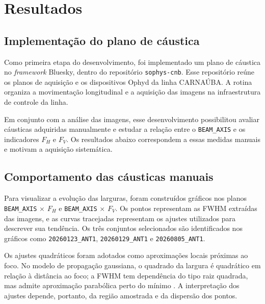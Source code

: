 \documentclass[12pt,a4paper]{article}
\makeatletter
\newcommand{\rotulosecao}[2]{%
    \phantomsection
    \def\@currentlabelname{#2}%
    \label{#1}%
}
\makeatother
\begin{document}
\clearpage
{}
\section*{Resultados}
\rotulosecao{sec:resultados}{Resultados}

\subsection*{Implementação do plano de cáustica}
\rotulosecao{sec:resultados-plano-caustica}{Implementação do plano de cáustica}

Como primeira etapa do desenvolvimento, foi implementado um plano de cáustica no \textit{framework} Bluesky, dentro do repositório \texttt{sophys-cnb}. Esse repositório reúne os planos de aquisição e os dispositivos Ophyd da linha CARNAÚBA. A rotina organiza a movimentação longitudinal e a aquisição das imagens na infraestrutura de controle da linha.

Em conjunto com a análise das imagens, esse desenvolvimento possibilitou avaliar cáusticas adquiridas manualmente e estudar a relação entre o \texttt{BEAM\_AXIS} e os indicadores $F_H$ e $F_V$. Os resultados abaixo correspondem a essas medidas manuais e motivam a aquisição sistemática.

\subsection*{Comportamento das cáusticas manuais}
\rotulosecao{sec:resultados-causticas-manuais}{Comportamento das cáusticas manuais}

Para visualizar a evolução das larguras, foram construídos gráficos nos planos \texttt{BEAM\_AXIS} $\times$ $F_H$ e \texttt{BEAM\_AXIS} $\times$ $F_V$. Os pontos representam as FWHM extraídas das imagens, e as curvas tracejadas representam os ajustes utilizados para descrever sua tendência. Os três conjuntos selecionados são identificados nos gráficos como \texttt{20260123\_ANT1}, \texttt{20260129\_ANT1} e \texttt{20260805\_ANT1}.

Os ajustes quadráticos foram adotados como aproximações locais próximas ao foco. No modelo de propagação gaussiana, o quadrado da largura é quadrático em relação à distância ao foco; a FWHM tem dependência do tipo raiz quadrada, mas admite aproximação parabólica perto do mínimo \cite{osterhoff2019foco}. A interpretação dos ajustes depende, portanto, da região amostrada e da dispersão dos pontos.
\end{document}

